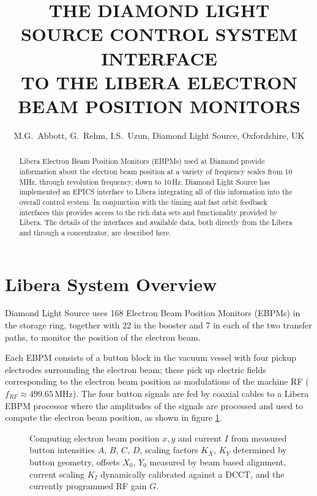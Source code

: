 \documentclass{JAC2003}
\begin{document}
\title{%
    THE DIAMOND LIGHT SOURCE CONTROL SYSTEM INTERFACE \\
    TO THE LIBERA ELECTRON BEAM POSITION MONITORS}

\author{%
    M.G.~Abbott, G.~Rehm, I.S.~Uzun,
    Diamond Light Source, Oxfordshire, UK}

\maketitle

\begin{abstract}
    Libera Electron Beam Position Monitors (EBPMs) used at Diamond provide
    information about the electron beam position at a variety of frequency
    scales from 10\,MHz, through revolution frequency, down to 10\,Hz.
    Diamond Light Source has implemented an EPICS interface to Libera
    integrating all of this information into the overall control system. In
    conjunction with the timing and fast orbit feedback interfaces this
    provides access to the rich data sets and functionality provided by
    Libera. The details of the interfaces and available data, both directly
    from the Libera and through a concentrator, are described here.
\end{abstract}




\section{Libera System Overview}

Diamond Light Source uses 168 Electron Beam Position Monitors (EBPMs) in the
storage ring, together with 22 in the booster and 7 in each of the two transfer
paths, to monitor the position of the electron beam.

Each EBPM consists of a button block in the vacuum vessel with four pickup
electrodes surrounding the electron beam; these pick up electric fields
corresponding to the electron beam position as modulations of the machine RF
($f_{RF} \approx 499.65\,$MHz).  The four button signals are fed by coaxial
cables to a Libera\cite{i-tech} EBPM processor where the amplitudes of the
signals are processed and used to compute the electron beam position, as shown
in figure \ref{buttons}.

\begin{figure}[h]
\centering

\caption{%
    Computing electron beam position $x,y$ and current $I$ from measured
    button intensities $A$, $B$, $C$, $D$, scaling factors $K_X$, $K_Y$
    determined by button geometry, offsets $X_0$, $Y_0$ measured by beam
    based alignment, current scaling $K_I$ dynamically calibrated against
    a DCCT, and the currently programmed RF gain $G$.
}
\label{buttons}
\end{figure}
\end{document}
